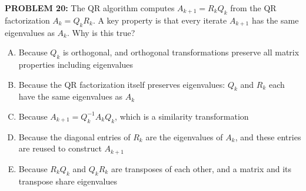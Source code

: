 \documentclass[12pt]{amsart}
\begin{document}
\newpage


{\bf PROBLEM 20:}
%
The QR algorithm computes $A_{k+1} = R_k Q_k$ from the QR factorization 
$A_k = Q_k R_k$.
%
A key property is that every iterate $A_{k+1}$ has the same eigenvalues 
as $A_k$.
%
Why is this true?

\begin{enumerate}[(A)]
\item Because $Q_k$ is orthogonal, and orthogonal transformations 
      preserve all matrix properties including eigenvalues
\item Because the QR factorization itself preserves eigenvalues: 
      $Q_k$ and $R_k$ each have the same eigenvalues as $A_k$
\item Because $A_{k+1} = Q_k^{-1} A_k Q_k$, which is a similarity 
      transformation
\item Because the diagonal entries of $R_k$ are the eigenvalues of 
      $A_k$, and these entries are reused to construct $A_{k+1}$
\item Because $R_k Q_k$ and $Q_k R_k$ are transposes of each other, 
      and a matrix and its transpose share eigenvalues
\end{enumerate}
\end{document}
